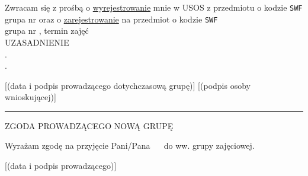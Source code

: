 \documentclass{wmiisubmission}
\begin{document}
\cracowdate
\studentinfo
\smallstudentaddress


\vskip 3.5cm


Zwracam się z prośbą o \underline{wyrejestrowanie} mnie w USOS z przedmiotu
o kodzie \texttt{SWF}\dotfill \\grupa nr \fillField{2cm} oraz o
\underline{zarejestrowanie} na przedmiot o kodzie \texttt{SWF}\dotfill\\
grupa nr \fillField{2cm}, termin zajęć \dotfill\\

UZASADNIENIE \dotfill\\
.\dotfill\\
.\dotfill\\

\vskip 0.6cm

\fillField{7cm}[(data i podpis prowadzącego dotychczasową grupę)] \hspace{\fill}
\fillField{7cm}[(podpis osoby wnioskującej)]
\vskip 1.0cm

\noindent\rule{\textwidth}{0.5pt}

\begin{center}
ZGODA PROWADZĄCEGO NOWĄ GRUPĘ
\end{center}

Wyrażam zgodę na przyjęcie Pani/Pana ~\dotfill~ do ww. grupy zajęciowej.

\vskip 2cm

\hspace{\fill} \fillField{6cm}[(data i podpis prowadzącego)] \hspace{2.0cm}
\end{document}
